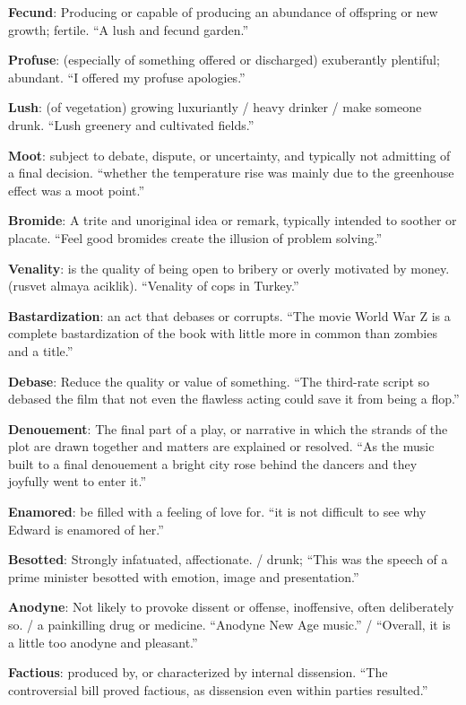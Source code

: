 \documentclass[12pt, a4paper]{ximera}
\begin{document}
\textbf{Fecund}: Producing or capable of producing an abundance of offspring or new growth; fertile. ``A lush and fecund garden.''

\textbf{Profuse}: (especially of something offered or discharged) exuberantly plentiful; abundant. ``I offered my profuse apologies.''

\textbf{Lush}: (of vegetation) growing luxuriantly / heavy drinker / make someone drunk. ``Lush greenery and cultivated fields.'' 

\textbf{Moot}: subject to debate, dispute, or uncertainty, and typically not admitting of a final decision. ``whether the temperature rise was mainly due to the greenhouse effect was a moot point.''

\textbf{Bromide}: A trite and unoriginal idea or remark, typically intended to soother or placate. ``Feel good bromides create the illusion of problem solving.''

\textbf{Venality}:  is the quality of being open to bribery or overly motivated by money. (rusvet almaya aciklik). ``Venality of cops in Turkey.''

\textbf{Bastardization}: an act that debases or corrupts. ``The movie World War Z is a complete bastardization of the book with little more in common than zombies and a title.''

\textbf{Debase}: Reduce the quality or value of something. ``The third-rate script so debased the film that not even the flawless acting could save it from being a flop.''

\textbf{Denouement}: The final part of a play, or narrative in which the strands of the plot are drawn together and matters are explained or resolved. ``As the music built to a final denouement a bright city rose behind the dancers and they joyfully went to enter it.''

\textbf{Enamored}: be filled with a feeling of love for. ``it is not difficult to see why Edward is enamored of her.''

\textbf{Besotted}: Strongly infatuated, affectionate. / drunk;  ``This was the speech of a prime minister besotted with emotion, image and presentation.''

\textbf{Anodyne}: Not likely to provoke dissent or offense, inoffensive, often deliberately so. / a painkilling drug or medicine. ``Anodyne New Age music.'' / ``Overall, it is a little too anodyne and pleasant.''

\textbf{Factious}: produced by, or characterized by internal dissension. ``The controversial bill proved factious, as dissension even within parties resulted.''
\end{document}
